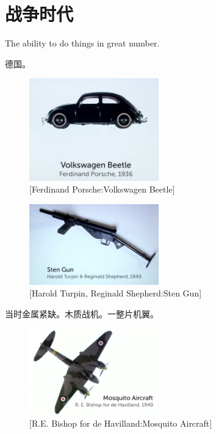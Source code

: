 \documentclass[UTF8]{../../../../RepresentationUniverse}
\begin{document}
\chapter{战争时代}

The ability to do things in great number.

德国。

\begin{figure}[h]
    \centering
    \includegraphics[width=0.5\textwidth]{./src/figures/Volkswagen Beetle_2023-04-09_19-47-01.png}
    \caption{[Ferdinand Porsche:Volkswagen Beetle]}
    \label{figure:Volkswagen Beetle}
\end{figure}

\begin{figure}[h]
    \centering
    \includegraphics[width=0.5\textwidth]{./src/figures/Sten Gun_2023-04-09_19-51-44.png}
    \caption{[Harold Turpin, Reginald Shepherd:Sten Gun]}
    \label{figure:Sten Gun}
\end{figure}



当时金属紧缺。木质战机。一整片机翼。
\begin{figure}[h]
    \centering
    \includegraphics[width=0.5\textwidth]{./src/figures/Mosquito Aircraft_2023-04-09_20-09-31.png}
    \caption{[R.E. Bishop for de Havilland:Mosquito Aircraft]}
    \label{figure:Mosquito Aircraft}
\end{figure}
\end{document}
